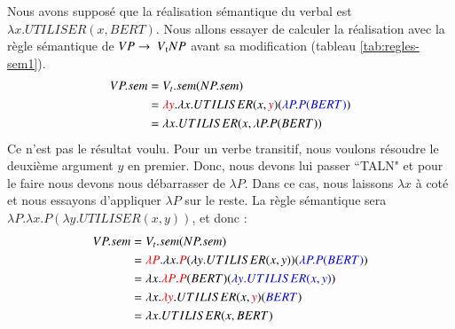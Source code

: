 \documentclass{KodeBook}
\begin{document}
Nous avons supposé que la réalisation sémantique du  verbal est $\lambda x.UTILISER(x, BERT)$. 
Nous allons essayer de calculer la réalisation avec la règle sémantique de $VP \rightarrow\ V\textsubscript{t} NP$ avant sa modification (tableau \ref{tab:regles-sem1}).
\begin{align*}
VP.sem & = V_t.sem(NP.sem )\\
& = \textcolor{red}{\lambda y}.\lambda x.UTILISER(x, \textcolor{red}{y})(\textcolor{blue}{\lambda P.P(BERT)})\\
& = \lambda x.UTILISER(x, \lambda P.P(BERT))
\end{align*}
Ce n'est pas le résultat voulu. 
Pour un verbe transitif, nous voulons résoudre le deuxième argument $y$ en premier. 
Donc, nous devons lui passer ``TALN" et pour le faire nous devons nous débarrasser de $\lambda P$. 
Dans ce cas, nous laissons $\lambda x$ à coté et nous essayons d'appliquer $\lambda P$ sur le reste. 
La règle sémantique sera $\lambda P.\lambda x.P(\lambda y.UTILISER(x, y))$, et donc :
\begin{align*}
VP.sem & = V_t.sem(NP.sem) \\
& = \textcolor{red}{\lambda P}.\lambda x.\textcolor{red}{P}(\lambda y.UTILISER(x, y))(\textcolor{blue}{\lambda P.P(BERT)}) \\
& = \lambda x.\textcolor{red}{\lambda P}.\textcolor{red}{P}(BERT)(\textcolor{blue}{\lambda y.UTILISER(x, y)}) \\
& = \lambda x.\textcolor{red}{\lambda y}.UTILISER(x, \textcolor{red}{y})(\textcolor{blue}{BERT}) \\
& = \lambda x.UTILISER(x, BERT) \\
\end{align*}
\end{document}

